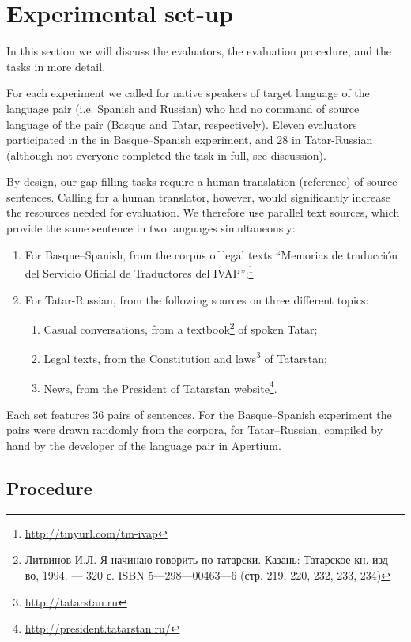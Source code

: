 \documentclass[11pt]{article}
\newcommand{\comment}[1]{\marginpar{\scriptsize\sf \textcolor{blue}{#1}}}
\newcommand{\rus}[1]{\foreignlanguage{russian}{#1}}
\begin{document}
\section{Experimental set-up}
\label{sec:setup}

In this section we will discuss the evaluators, the evaluation procedure, and the tasks in more detail.

For each experiment we called for native speakers of target language of the language pair (i.e.
Spanish and Russian) who had no command of source language of the pair (Basque
and Tatar, respectively). Eleven evaluators participated in the in Basque--Spanish experiment, and 28 in Tatar-Russian (although not everyone completed the task
in full, see discussion).

\comment{EA: maybe I should put this into the previous section?}
By design, our gap-filling tasks require a human translation (reference) of source sentences. Calling for a human translator, however, would significantly increase the resources needed for evaluation. We therefore use parallel text sources, which provide the same sentence in two languages simultaneously:
\begin{enumerate}
\item  For Basque--Spanish, from the corpus of legal texts ``Memorias de traducci\'on del
Servicio Oficial de Traductores del IVAP'';\footnote{\url{http://tinyurl.com/tm-ivap}}
\item  For Tatar-Russian, from the following sources on three different topics:
  \begin{enumerate}
    \item  Casual conversations, from a textbook\footnote{\rus{Литвинов И.Л. Я начинаю говорить по-татарски. Казань: Татарское кн. изд-во, 1994. — 320 с. ISBN 5—298—00463—6 (стр. 219, 220, 232, 233, 234)}} of spoken Tatar;
    \item  Legal texts, from the Constitution and laws\footnote{\url{http://tatarstan.ru}} of Tatarstan;
    \item  News, from the President of Tatarstan website\footnote{\url{http://president.tatarstan.ru/}}.
  \end{enumerate}
\end{enumerate}

Each set features 36 pairs of sentences. For the Basque--Spanish experiment the pairs were drawn
randomly from the corpora, for Tatar--Russian, compiled by hand by the developer of the
language pair in Apertium.

\subsection{Procedure}
\end{document}
